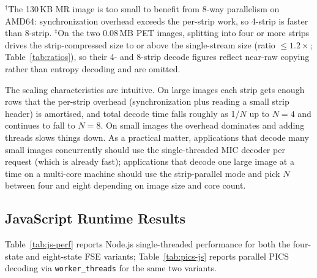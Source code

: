 \documentclass[journal]{IEEEtran}
\begin{document}
\noindent $^\dagger$The 130\,KB MR image is too small to benefit from 8-way
parallelism on AMD64: synchronization overhead exceeds the per-strip work, so
4-strip is faster than 8-strip.
$^\ddagger$On the two 0.08\,MB PET images, splitting into four or more strips
drives the strip-compressed size to or above the single-stream size
(ratio $\le 1.2\times$; Table~\ref{tab:ratios}), so their 4- and 8-strip
decode figures reflect near-raw copying rather than entropy decoding and are
omitted.

The scaling characteristics are intuitive. On large images each strip
gets enough rows that the per-strip overhead (synchronization plus
reading a small strip header) is amortised, and total decode time falls
roughly as 1/$N$ up to $N=4$ and continues to fall to $N=8$. On small
images the overhead dominates and adding threads slows things down. As
a practical matter, applications that decode many small images
concurrently should use the single-threaded MIC decoder per request
(which is already fast); applications that decode one large image at a
time on a multi-core machine should use the strip-parallel mode and pick
$N$ between four and eight depending on image size and core count.

\subsection{JavaScript Runtime Results}
\label{subsec:js-state-effect}

Table~\ref{tab:js-perf} reports Node.js single-threaded performance for
both the four-state and eight-state FSE variants;
Table~\ref{tab:pics-js} reports parallel PICS decoding via
\texttt{worker\_threads} for the same two variants.
\end{document}
